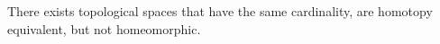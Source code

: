         \hfill
        \par\hfill\par
        \begin{theorem}
            \label{thm:HE_of_Punc_Plane_and_Circle_Not_Homeo}%
            There exists topological spaces that have the same
            cardinality, are homotopy equivalent, but not homeomorphic.
        \end{theorem}
